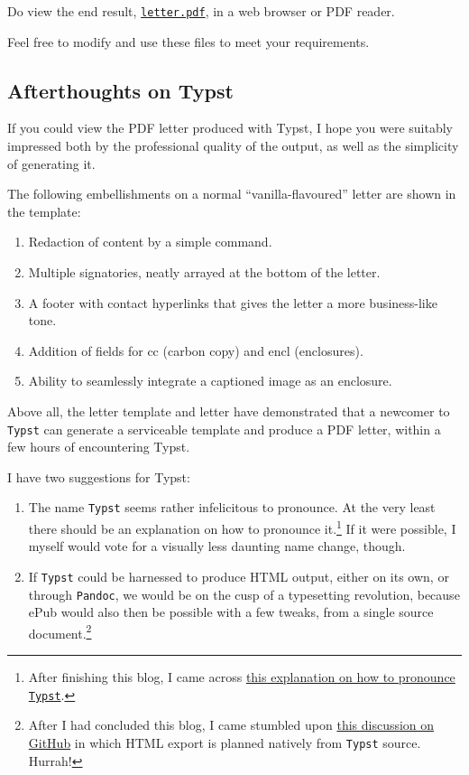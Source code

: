 \documentclass[
  a4paper,
]{article}
\begin{document}
Do view the end result,
\href{auxiliary/letter.pdf}{\texttt{letter.pdf}}, in a web browser or
PDF reader.

Feel free to modify and use these files to meet your requirements.

\subsection{Afterthoughts on Typst}\label{afterthoughts-on-typst}

If you could view the PDF letter produced with Typst, I hope you were
suitably impressed both by the professional quality of the output, as
well as the simplicity of generating it.

The following embellishments on a normal ``vanilla-flavoured'' letter
are shown in the template:

\begin{enumerate}
\def\labelenumi{\alph{enumi}.}
\item
  Redaction of content by a simple command.
\item
  Multiple signatories, neatly arrayed at the bottom of the letter.
\item
  A footer with contact hyperlinks that gives the letter a more
  business-like tone.
\item
  Addition of fields for cc (carbon copy) and encl (enclosures).
\item
  Ability to seamlessly integrate a captioned image as an enclosure.
\end{enumerate}

Above all, the letter template and letter have demonstrated that a
newcomer to \texttt{Typst} can generate a serviceable template and
produce a PDF letter, within a few hours of encountering Typst.

I have two suggestions for Typst:

\begin{enumerate}
\def\labelenumi{\roman{enumi}.}
\item
  The name \texttt{Typst} seems rather infelicitous to pronounce. At the
  very least there should be an explanation on how to pronounce
  it.\footnote{After finishing this blog, I came across
    \href{https://github.com/typst/typst\#pronunciation-and-spelling}{this
    explanation on how to pronounce \texttt{Typst}}.} If it were
  possible, I myself would vote for a visually less daunting name
  change, though.  \normalfont
\item
  If \texttt{Typst} could be harnessed to produce HTML output, either on
  its own, or through \texttt{Pandoc}, we would be on the cusp of a
  typesetting revolution, because ePub would also then be possible with
  a few tweaks, from a single source document.\footnote{After I had
    concluded this blog, I came stumbled upon
    \href{https://github.com/typst/typst/issues/721}{this discussion on
    GitHub} in which HTML export is planned natively from \texttt{Typst}
    source. Hurrah!}
\end{enumerate}
\end{document}
